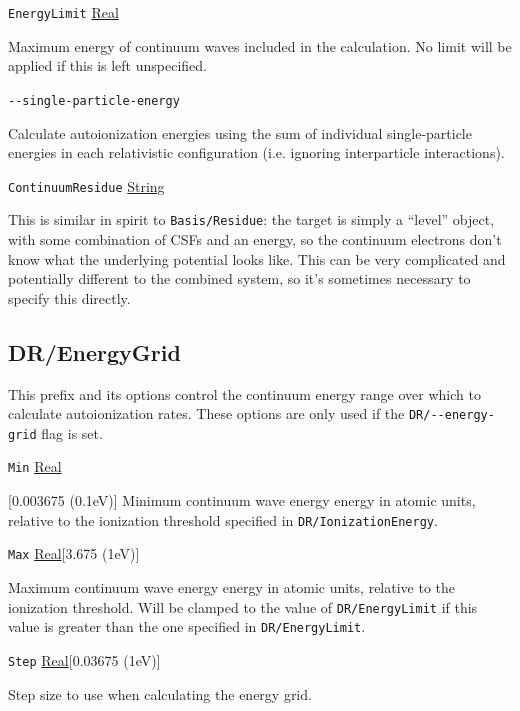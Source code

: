 \documentclass{report}
\begin{document}
\texttt{EnergyLimit} \uline{Real}
\begin{adjustwidth}{1cm}{}
Maximum energy of continuum waves included in the calculation. No limit will be applied if this is left
unspecified.
\end{adjustwidth}

\texttt{{-}{-}single-particle-energy}
\begin{adjustwidth}{1cm}{}
Calculate autoionization energies using the sum of individual single-particle energies in each
relativistic configuration (i.e. ignoring interparticle interactions).
\end{adjustwidth}

\texttt{ContinuumResidue} \uline{String}
\begin{adjustwidth}{1cm}{}
This is similar in spirit to \texttt{Basis/Residue}: the target 
is simply a ``level'' object, with some combination of CSFs and an energy, so the continuum electrons 
don't know what the underlying potential looks like. This can be very complicated and potentially 
different to the combined system, so it's sometimes necessary to specify this directly.
\end{adjustwidth}

\subsection{DR/EnergyGrid}
This prefix and its options control the continuum energy range over which to calculate autoionization
rates. These options are only used if the \texttt{DR/{-}{-}energy-grid} flag is set.

\texttt{Min} \uline{Real}
\begin{adjustwidth}{1cm}{}[0.003675 (0.1eV)]
Minimum continuum wave energy energy in atomic units, relative to the ionization threshold specified in
\texttt{DR/IonizationEnergy}.
\end{adjustwidth}

\texttt{Max} \uline{Real}[3.675 (1eV)]
\begin{adjustwidth}{1cm}{}
Maximum continuum wave energy energy in atomic units, relative to the ionization threshold. Will be
clamped to the value of \texttt{DR/EnergyLimit} if this value is greater than the one specified in
\texttt{DR/EnergyLimit}.
\end{adjustwidth}

\texttt{Step} \uline{Real}[0.03675 (1eV)]
\begin{adjustwidth}{1cm}{}
Step size to use when calculating the energy grid.
\end{adjustwidth}
\end{document}
